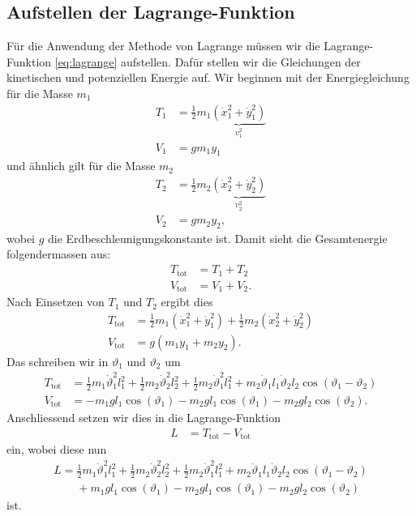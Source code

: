 \subsection{Aufstellen der Lagrange-Funktion}
Für die Anwendung der Methode von Lagrange müssen wir die Lagrange-Funktion 
\eqref{eq:lagrange} aufstellen.
Dafür stellen wir die Gleichungen der kinetischen und potenziellen Energie auf.
%
%
Wir beginnen mit der Energiegleichung für die Masse \(m_1\)
\begin{align*}
    T_1 &= \frac{1}{2} m_1 
    \underbrace{( \dot{x}_1^2 + \dot{y}_1^2 )}_{\displaystyle v_1^2}\\
    V_1 &= g m_1 y_1
\end{align*}
und ähnlich gilt für die Masse \(m_2\)
\begin{align*}
    T_2 &= \frac{1}{2} m_2 
    \underbrace{( \dot{x}_2^2 + \dot{y}_2^2 )}_{\displaystyle v_2^2}\\
    V_2 &= g m_2 y_2,
\end{align*}
wobei \(g\) die Erdbeschleunigungskonstante ist.
%
%
Damit sieht die Gesamtenergie folgendermassen aus:
\begin{align*}
    T_{\text{tot}} &= T_1 + T_2\\
    V_{\text{tot}} &= V_1 + V_2.
\end{align*}
Nach Einsetzen von \(T_1\) und \(T_2\) ergibt dies
\begin{align*}
    T_{\text{tot}} &= \frac{1}{2} m_1 ( \dot{x}_1^2 + \dot{y}_1^2 ) +
    \frac{1}{2} m_2 ( \dot{x}_2^2 + \dot{y}_2^2 )\\
    V_{\text{tot}} &= g ( m_1 y_1 + m_2 y_2 ).
\end{align*}
Das schreiben wir in \(\vartheta_1\) und \(\vartheta_2\) um
\begin{align*}
    T_{\text{tot}} &= \frac{1}{2} m_1 \dot{\vartheta}^2_1 l_1^2 + 
    \frac{1}{2} m_2 \dot{\vartheta}^2_2 l_2^2 + \frac{1}{2}
    m_2 \dot{\vartheta}^2_1 l_1^2 + 
    m_2 \dot{\vartheta}_1 l_1 \dot{\vartheta}_2 l_2 
    \cos(\vartheta_1 - \vartheta_2)\\
    V_{\text{tot}} &= -m_1 g l_1 \cos(\vartheta_1) -
    m_2 g l_1 \cos(\vartheta_1) -
    m_2 g l_2 \cos(\vartheta_2).
\end{align*}
Anschliessend setzen wir dies in die Lagrange-Funktion
\begin{align*}
    L &= T_{\text{tot}} - V_{\text{tot}}
\end{align*}
ein, wobei diese nun
\begin{align*}
    L = \frac{1}{2} m_1 \dot{\vartheta}^2_1 l_1^2 + 
    \frac{1}{2} m_2 \dot{\vartheta}^2_2 l_2^2 + \frac{1}{2}
    m_2 \dot{\vartheta}^2_1 l_1^2 + 
    m_2 \dot{\vartheta}_1 l_1 \dot{\vartheta}_2 l_2 
    \cos(\vartheta_1 - \vartheta_2)\\ \nonumber
    \qquad + m_1 g l_1 \cos(\vartheta_1) -
    m_2 g l_1 \cos(\vartheta_1) -
    m_2 g l_2 \cos(\vartheta_2)
\end{align*}
ist.

